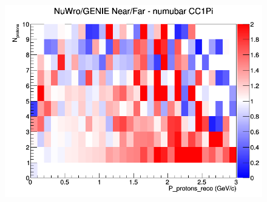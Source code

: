 \begin{figure}[h]
\endminipage
{}
\includegraphics[width=\linewidth]{eff_N_P/LAr/protons/ratios/CC1Pi_NuWro_GENIE_numubar_NF_N_P.png}
\endminipage
\newline
\end{figure}
\clearpage
